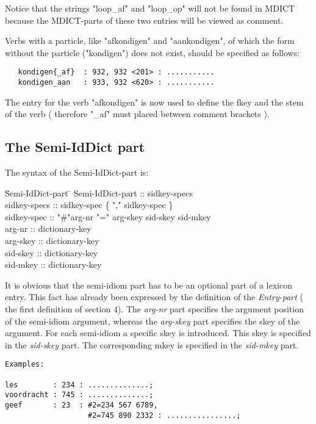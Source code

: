 Notice that the strings "loop\_af" and "loop\_op" will not be found in MDICT 
because the MDICT-parts of these two entries will be viewed as comment.

Verbs with a particle, like "afkondigen" and "aankondigen", of which 
the form without the particle ("kondigen") does not exist, should be specified 
as follows:

\begin {verbatim}
   kondigen{_af}  : 932, 932 <201> : ...........
   kondigen_aan   : 933, 932 <620> : ...........
\end{verbatim}

The entry for the verb "afkondigen" is now used to define the fkey and the 
stem of the verb ( therefore "\_af" must placed between comment brackets ). 

\subsection {The Semi-IdDict part}

The syntax of the Semi-IdDict-part is:

\begin {tabbing}
   \= Semi-IdDict-part \= \kill
   \> Semi-IdDict-part \> :: sidkey-specs \\
   \> sidkey-specs\> :: sidkey-spec \{ "," sidkey-spec \} \\
   \> sidkey-spec \> :: "\#"arg-nr "=" arg-skey sid-skey sid-mkey \\
   \> arg-nr      \> :: dictionary-key \\
   \> arg-skey    \> :: dictionary-key \\
   \> sid-skey    \> :: dictionary-key \\
   \> sid-mkey    \> :: dictionary-key
\end {tabbing}

It is obvious that the semi-idiom part has to be an optional part of
a lexicon entry. This fact has already been expressed by the definition of the
{\em Entry-part} ( the first definition of section 4).
The {\em arg-nr} part specifies the argument position of
the semi-idiom argument, whereas the {\em arg-skey} part specifies the skey of 
the argument. For each semi-idiom a specific skey is introduced. This skey
is specified in the {\em sid-skey} part. The corresponding mkey is specified
in the {\em sid-mkey} part.
\begin{verbatim}
Examples:

les        : 234 : ..............;
voordracht : 745 : ..............;
geef       : 23  : #2=234 567 6789,
                   #2=745 890 2332 : ................;
\end{verbatim}


